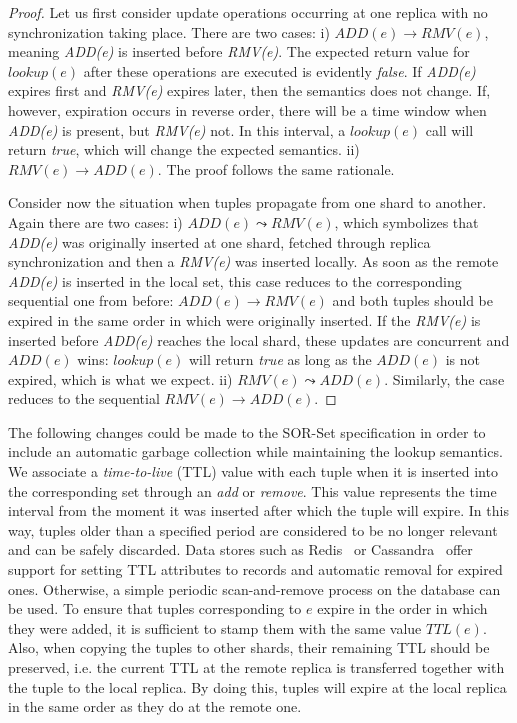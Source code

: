 \begin{proof}
Let us first consider update operations occurring at one replica with no
synchronization taking place. There are two cases: i) $ADD(e) \rightarrow
RMV(e)$, meaning \textit{ADD(e)} is inserted before \textit{RMV(e)}. The
expected return value for $\textit{lookup}(e)$ after these operations are
executed is evidently \textit{false}. If \textit{ADD(e)} expires first and
\textit{RMV(e)} expires later, then the semantics does not change. If, however,
expiration occurs in reverse order, there will be a time window when
\textit{ADD(e)} is present, but \textit{RMV(e)} not. In this interval, a
$\textit{lookup}(e)$ call will return \textit{true}, which will change the
expected semantics. ii) $RMV(e) \rightarrow ADD(e)$. The proof follows the same
rationale.

Consider now the situation when tuples propagate from one shard to another.
Again there are two cases: i) $ADD(e) \leadsto RMV(e)$, which symbolizes that
\textit{ADD(e)} was originally inserted at one shard, fetched through replica
synchronization and then a \textit{RMV(e)} was inserted locally. As soon as the
remote \textit{ADD(e)} is inserted in the local set, this case reduces to the
corresponding sequential one from before: $ADD(e) \rightarrow RMV(e)$ and both
tuples should be expired in the same order in which were originally inserted.
If the \textit{RMV(e)} is inserted before \textit{ADD(e)} reaches the local
shard, these updates are concurrent and $ADD(e)$ wins: $\textit{lookup}(e)$ will
return \textit{true} as long as the $ADD(e)$ is not expired, which is what we
expect. ii) $RMV(e) \leadsto ADD(e)$. Similarly, the case reduces to the
sequential $RMV(e) \rightarrow ADD(e)$.
\end{proof}

The following changes could be made to the SOR-Set specification in order to
include an automatic garbage collection while maintaining the lookup semantics. 
We associate a \textit{time-to-live} (TTL) value with each tuple when it is
inserted into the corresponding set through an \textit{add} or \textit{remove}.
This value represents the time interval from the moment it was inserted after
which the tuple will expire. In this way, tuples older than a specified
period are considered to be no longer relevant and can be safely discarded. Data
stores such as Redis~\cite{redis} or Cassandra~\cite{cassandra} offer support
for setting TTL attributes to records and automatic removal for expired ones.
Otherwise, a simple periodic scan-and-remove process on the database can be
used. To ensure that tuples corresponding to $e$ expire in the order in which
they were added, it is sufficient to stamp them with the same value $TTL(e)$.
Also, when copying the tuples to other shards, their remaining TTL should be
preserved, i.e. the current TTL at the remote replica is transferred together
with the tuple to the local replica. By doing this, tuples will expire at the
local replica in the same order as they do at the remote one.

